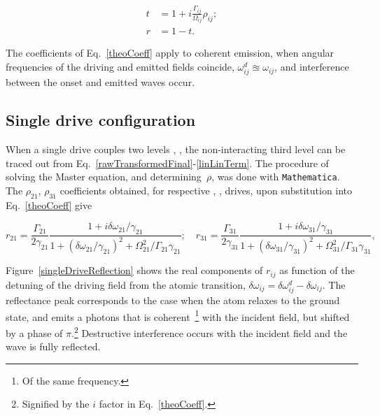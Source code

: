 \begin{equation}\label{theoCoeff}
  \begin{aligned}
    t & = 1 + i\frac{\Gamma_{ij}}{\Omega_{ij}}\rho_{ij};\\
    r & = 1-t.
  \end{aligned}
\end{equation}

\noindent The  coefficients of Eq.~\eqref{theoCoeff} apply  to coherent emission,
when  angular   frequencies  of   the  driving   and  emitted   fields  coincide,
$ \omega^{d}_{ij} \approxeq\omega_{ij} $, and  interference between the onset and
emitted waves occur.

  \subsection{Single drive configuration\label{subsec:singleDrive}}
  When a single drive couples  two levels , , the non-interacting
  third         level        can         be        traced         out        from
  Eq.~\eqref{rawTransformedFinal}-\eqref{linLinTerm}.  The  procedure of  solving
  the   Master   equation,   and   determining~$    \rho   $,   was   done   with
  \texttt{Mathematica}. The $  \rho_{21} $, $ \rho_{31}  $ coefficients obtained,
  for   respective  \lra{},   \lra{},  drives,   upon
  substitution into Eq.~\eqref{theoCoeff} give

\begin{equation}
  r_{21}=\frac{\Gamma_{21}}{2\gamma_{21}}\frac{1+i\delta\omega_{21}/\gamma_{21}}{1+(\delta\omega_{21}/\gamma_{21})^2+\Omega_{21}^2/\Gamma_{21}\gamma_{21}}; \quad r_{31}=\frac{\Gamma_{31}}{2\gamma_{31}}\frac{1+i\delta\omega_{31}/\gamma_{31}}{1+(\delta\omega_{31}/\gamma_{31})^2+\Omega_{31}^2/\Gamma_{31}\gamma_{31}},
  \label{singleReflectance}
\end{equation}

Figure~\ref{singleDriveReflection} shows  the real  components of  $ r_{ij}  $ as
function  of the  detuning  of  the driving  field  from  the atomic  transition,
$ \delta\omega_{ij}  = \delta\omega_{ij}^{d}-\delta\omega_{ij}$.  The reflectance
peak corresponds to the case when the atom relaxes to the ground state, and emits
a photons  that is coherent~\footnote{Of  the same frequency.} with  the incident
field, but shifted by a phase of $  \pi $.\footnote{Signified by the $ i $ factor
  in Eq.~\eqref{theoCoeff}.}  Destructive interference  occurs with  the incident
field and the wave is fully reflected.

